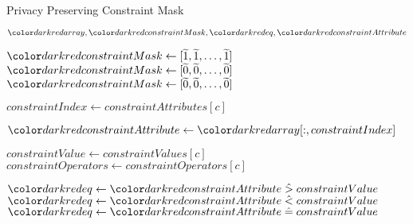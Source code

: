 \begin{algorithm}[H]
\caption{Privacy Preserving Constraint Mask}\label{a:filters-constraint-mask}
\begin{algorithmic}[1]
\renewcommand{\algorithmicrequire}{\textbf{Private Vars:}}
\Require $\red{array}, \red{constraintMask}, \red{eq}, \red{constraintAttribute}$


        \State $\red{constraintMask} \gets [\enc{1}, \enc{1}, \dots, \enc{1}]$ 
        \State $\red{constraintMask} \gets [\enc{0}, \enc{0}, \dots, \enc{0}]$ 
        \State $\red{constraintMask} \gets [\enc{0}, \enc{0}, \dots, \enc{0}]$ 
    \EndIf


        \State $constraintIndex \gets constraintAttributes[c]$

        \State $\red{constraintAttribute} \gets \red{array}[:, constraintIndex]$

        \State $constraintValue \gets constraintValues[c]$
        \State $constraintOperators \gets constraintOperators[c]$

            \State $\red{eq} \gets \red{constraintAttribute} \hgt constraintValue$ 
            \State $\red{eq} \gets \red{constraintAttribute} \hlt constraintValue$
            \State $\red{eq} \gets \red{constraintAttribute} \heq constraintValue$
        \EndIf


\end{algorithmic}
\end{algorithm}
